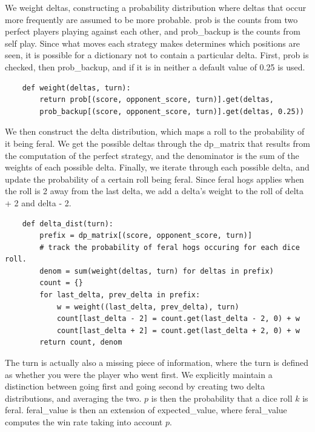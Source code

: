 \documentclass[11pt, oneside]{article}
\begin{document}
We weight deltas, constructing a probability distribution where
deltas that occur more frequently are assumed to be more probable.
prob is the counts from two perfect players playing against each other,
and prob\_backup is the counts from self play.
Since what moves each strategy makes determines which positions are seen,
it is possible for a dictionary not to contain a particular delta.
First, prob is checked, then prob\_backup, and if it is in neither a 
default value of 0.25 is used.

\begin{verbatim}
    def weight(deltas, turn):
        return prob[(score, opponent_score, turn)].get(deltas,
        prob_backup[(score, opponent_score, turn)].get(deltas, 0.25)) 
\end{verbatim} 

We then construct the delta distribution, which maps a roll
to the probability of it being feral.
We get the possible deltas through the dp\_matrix that results from 
the computation of the perfect strategy, 
and the denominator is the sum of the weights of each possible delta.
Finally, we iterate through each possible delta,
and update the probability of a certain roll being feral.
Since feral hogs applies when the roll is 2 away from the last delta,
we add a delta's weight to the roll of delta + 2 and delta - 2.

\begin{verbatim}
    def delta_dist(turn):
        prefix = dp_matrix[(score, opponent_score, turn)]
        # track the probability of feral hogs occuring for each dice roll.
        denom = sum(weight(deltas, turn) for deltas in prefix)
        count = {}
        for last_delta, prev_delta in prefix:
            w = weight((last_delta, prev_delta), turn)
            count[last_delta - 2] = count.get(last_delta - 2, 0) + w
            count[last_delta + 2] = count.get(last_delta + 2, 0) + w 
        return count, denom
\end{verbatim} 

The turn is actually also a missing piece of information, where the turn
is defined as whether you were the player who went first.
We explicitly maintain a distinction between going first and going second
by creating two delta distributions, and averaging the two.
\( p \) is then the probability that a dice roll \( k \) is feral.
feral\_value is then an extension of expected\_value, where feral\_value
computes the win rate taking into account \( p \).
\end{document}
